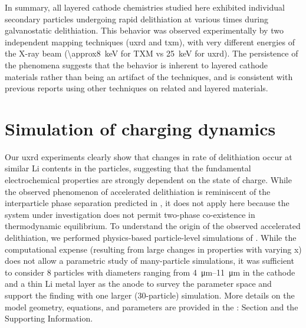 \documentclass{WileyMSP-template}
\begin{document}
In summary, all layered cathode chemistries studied here exhibited
individual secondary particles undergoing rapid delithiation at
various times during galvanostatic delithiation. This behavior was
observed experimentally by two independent mapping techniques
(\gls{uxrd} and \gls{txm}), with very different energies of the X-ray
beam (\SI{\approx8}{\kilo\electronvolt} for TXM vs
\SI{25}{\kilo\electronvolt} for \gls{uxrd}). The persistence of the
phenomena suggests that the behavior is inherent to layered cathode
materials rather than being an artifact of the techniques, and is
consistent with previous reports using other techniques on related
\nmc{} and  layered
materials\cite{chueh2021,rao2021,wang2020-6}.

\section{Simulation of charging dynamics}


Our \gls{uxrd} experiments clearly show that changes in rate of
delithiation occur at similar Li contents in the particles, suggesting
that the fundamental electrochemical properties are strongly dependent
on the state of charge. While the observed phenomenon of accelerated
delithiation is reminiscent of the interparticle phase separation
predicted in  \cite{boesenberg2013,thornton2014},
it does not apply here because the system under investigation does not
permit two-phase co-existence in thermodynamic equilibrium. To
understand the origin of the observed accelerated delithiation, we
performed physics-based particle-level simulations of . While
the computational expense (resulting from large changes in properties
with varying x) does not allow a parametric study of many-particle
simulations, it was sufficient to consider 8 particles with diameters
ranging from \SIrange{4}{11}{\micro\meter} in the cathode and a thin
Li metal layer as the anode to survey the parameter space and support
the finding with one larger (30-particle) simulation. More details on
the model geometry, equations, and parameters are provided in the
:  Section and
the Supporting Information.
\end{document}
